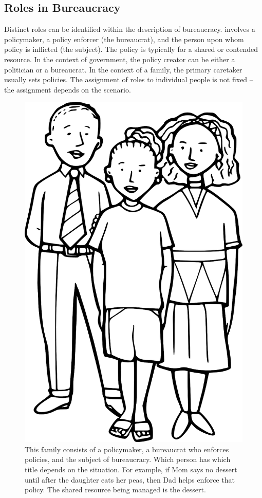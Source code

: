 \subsection*{Roles in Bureaucracy}

Distinct roles can be identified within the description of bureaucracy.
\iftoggle{glossarysubstitutionworks}{\Gls{core bureaucracy}}{Bureaucracy} involves 
a \gls{policymaker}, 
a policy enforcer (the bureaucrat), and the person upon whom policy is inflicted 
(the \gls{subject}). 
The policy is typically for a shared or contended resource. In the context of government, the policy creator can be either a politician or a bureaucrat. In the context of a family, the primary caretaker usually sets policies. The assignment of roles to individual people is not fixed -- the assignment depends on the scenario. 

\begin{figure}
    \centering
    \includegraphics[width=.6\textwidth]{images/family-father-mother-daughter-28725_1280_pixabay.png}
    \caption{This family consists of a policymaker, a bureaucrat who enforces policies, and the subject of bureaucracy. Which person has which title depends on the situation. For example, if Mom says no dessert until after the daughter eats her peas, then Dad helps enforce that policy. The shared resource being managed is the dessert. }
    \label{fig:family-of-bureaucrats}
\end{figure}

